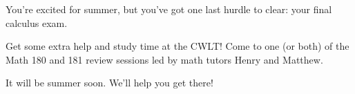 You're excited for summer, but you've got one last hurdle to clear: your final calculus exam.

\noindent
Get some extra help and study time at the CWLT! Come to one (or both) of the Math 180 and 181 review sessions led by math tutors Henry and Matthew. 

\noindent
It will be summer soon. We'll help you get there!